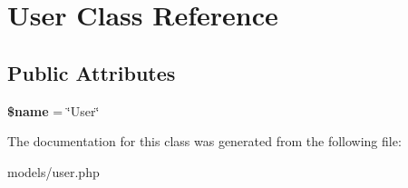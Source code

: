 \hypertarget{class_user}{
\section{\-User \-Class \-Reference}
\label{class_user}
}
\subsection*{\-Public \-Attributes}
\begin{DoxyCompactItemize}
\item 
\hypertarget{class_user_ae667f163668e10bcaaaf10113854dd69}{
{\bfseries \$name} = \char`\"{}\-User\char`\"{}}
\label{class_user_ae667f163668e10bcaaaf10113854dd69}

\end{DoxyCompactItemize}


\-The documentation for this class was generated from the following file\-:\begin{DoxyCompactItemize}
\item 
models/user.\-php\end{DoxyCompactItemize}
